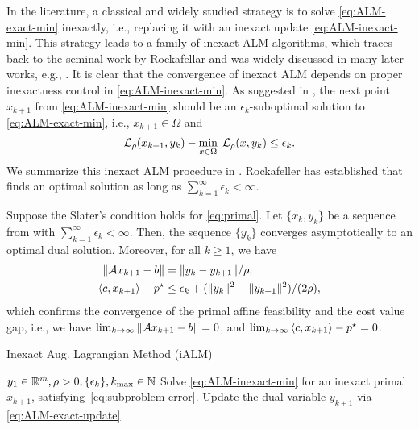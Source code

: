 \documentclass[11pt]{article}
\begin{document}
In the literature, a classical and widely studied strategy is to solve \cref{eq:ALM-exact-min} inexactly, i.e., replacing it with an inexact update \cref{eq:ALM-inexact-min}. This strategy leads to a family of inexact ALM algorithms, which traces back to the seminal work by Rockafellar \cite{rockafellar1976augmented} and was widely discussed in many later works, e.g., \cite{luque1984asymptotic,liu2019nonergodic,xu2021iteration}. It is clear that the convergence of inexact ALM depends on proper inexactness control in \cref{eq:ALM-inexact-min}. As suggested in \cite{rockafellar1976augmented}, the next point $x_{k+1}$ from \cref{eq:ALM-inexact-min} should be an $\epsilon_k$-suboptimal solution to \cref{eq:ALM-exact-min}, i.e., $x_{k+1} \in \Omega$ and 
\begin{equation}
    \label{eq:subproblem-error}
    \mathcal{L}_{\rho}(x_{k+1},y_k) - \min_{x \in \Omega}\; \mathcal{L}_{\rho}(x,y_k) \leq \epsilon_k.
\end{equation}
We summarize this inexact ALM procedure in . 
% 
Rockafeller \cite{rockafellar1976augmented} has established that  finds an optimal solution as long as  $\sum_{k=1}^{\infty} \epsilon_k < \infty$.
\begin{theorem}
    \label{thm:ALM-convergence}
   Suppose the Slater's condition holds for \cref{eq:primal}. Let $\{x_k,y_k\}$ be a sequence from  with $\sum_{k=1}^\infty \epsilon_k < \infty$. Then, the sequence $\{y_k\}$ converges asymptotically to an optimal dual solution. Moreover, 
   for all $k \geq 1$, we have  
   \begin{subequations}
   \label{eq:ALM-residual}
       \begin{align}
           \|\mathcal{A} x_{k+1} - b\|&  =  \|y_k - y_{k+1}\|/\rho, \label{eq:ALM-affine}
            \\
            \left \langle c, x_{k+1} \right\rangle - p^\star & \leq \epsilon_k             +   ( \|y_k\|^2 -\|y_{k+1}\|^2)/(2\rho), \label{eq:ALM-cost}
       \end{align}
   \end{subequations}
     which confirms the convergence of the primal affine feasibility and the cost value gap, i.e., we have $\lim_{k\to \infty} \|\mathcal{A} x_{k+1} - b\| = 0$, and $\lim_{k\to \infty}  \left \langle c, x_{k+1} \right\rangle -p^\star = 0$. 
\end{theorem}

\begin{algorithm}[t]
\caption{Inexact Aug. Lagrangian Method (iALM)}\label{alg:alm}
\begin{algorithmic}[1]
\Require $y_1 \in \mathbb{R}^m, \rho > 0, \{\epsilon_k\} , k_{\max} \in \mathbb{N}$
    \State Solve \cref{eq:ALM-inexact-min} for an inexact primal $x_{k+1}$, satisfying~\cref{eq:subproblem-error}.
    \State Update the dual variable $y_{k+1}$ via \cref{eq:ALM-exact-update}. 
\EndFor
\end{algorithmic}
\end{algorithm}
\end{document}
